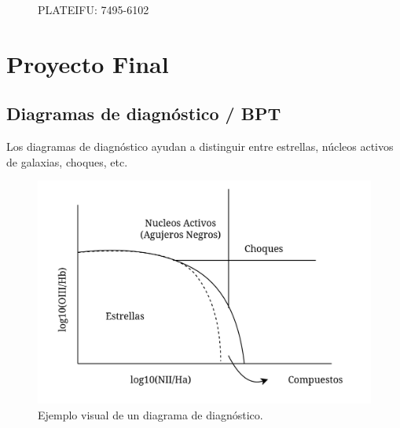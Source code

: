 \documentclass[9pt,twocolumn,a4paper]{opticajnl}
\begin{document}
\begin{figure}
    \caption{PLATEIFU: 7495-6102}
    \label{fig:moreinfo}
\end{figure}

\newpage


\section*{Proyecto Final}

\subsection*{Diagramas de diagnóstico / BPT}
Los diagramas de diagnóstico ayudan a distinguir entre estrellas, núcleos activos de galaxias, choques, etc.

\begin{figure}
  \begin{center}
    \includegraphics[width=1\linewidth]{./diagrama_ejemplo.png}
  \end{center}
  \caption{Ejemplo visual de un diagrama de diagnóstico.}
  \label{fig:diagrama_profe}
\end{figure}
\end{document}
